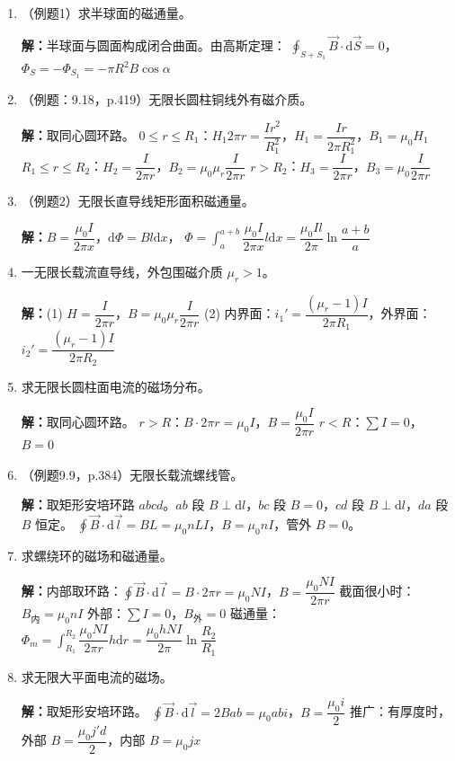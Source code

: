 \documentclass{ctexart}
\begin{document}
\begin{enumerate}
\item（例题1）求半球面的磁通量。

\textbf{解：}半球面与圆面构成闭合曲面。由高斯定理：
$\displaystyle\oint_{S+S_1} \vec{B}\cdot\mathrm{d}\vec{S} = 0$，$\Phi_S = -\Phi_{S_1} = -\pi R^{2}B\cos\alpha$

\item（例题：9.18，p.419）无限长圆柱铜线外有磁介质。

\textbf{解：}取同心圆环路。
$0 \le r \le R_1$：$H_1 2\pi r = \dfrac{Ir^{2}}{R_1^{2}}$，$H_1 = \dfrac{Ir}{2\pi R_1^{2}}$，$B_1 = \mu_0 H_1$
$R_1 \le r \le R_2$：$H_2 = \dfrac{I}{2\pi r}$，$B_2 = \mu_0\mu_r\dfrac{I}{2\pi r}$
$r > R_2$：$H_3 = \dfrac{I}{2\pi r}$，$B_3 = \mu_0\dfrac{I}{2\pi r}$

\item（例题2）无限长直导线矩形面积磁通量。

\textbf{解：}$B = \dfrac{\mu_0 I}{2\pi x}$，$\mathrm{d}\Phi = B l\mathrm{d}x$，
$\Phi = \displaystyle\int_a^{a+b} \dfrac{\mu_0 I}{2\pi x}l\mathrm{d}x = \dfrac{\mu_0 Il}{2\pi}\ln\dfrac{a+b}{a}$

\item 一无限长载流直导线，外包围磁介质 $\mu_r > 1$。

\textbf{解：}(1) $H = \dfrac{I}{2\pi r}$，$B = \mu_0\mu_r\dfrac{I}{2\pi r}$
(2) 内界面：$i_1' = \dfrac{(\mu_r - 1)I}{2\pi R_1}$，外界面：$i_2' = \dfrac{(\mu_r - 1)I}{2\pi R_2}$

\item 求无限长圆柱面电流的磁场分布。

\textbf{解：}取同心圆环路。
$r > R$：$B\cdot 2\pi r = \mu_0 I$，$B = \dfrac{\mu_0 I}{2\pi r}$
$r < R$：$\sum I = 0$，$B = 0$

\item（例题9.9，p.384）无限长载流螺线管。

\textbf{解：}取矩形安培环路 $abcd$。$ab$ 段 $B\perp\mathrm{d}l$，$bc$ 段 $B = 0$，$cd$ 段 $B\perp\mathrm{d}l$，$da$ 段 $B$ 恒定。
$\displaystyle\oint \vec{B}\cdot\mathrm{d}\vec{l} = BL = \mu_0 nLI$，$B = \mu_0 nI$，管外 $B = 0$。

\item 求螺绕环的磁场和磁通量。

\textbf{解：}内部取环路：$\displaystyle\oint \vec{B}\cdot\mathrm{d}\vec{l} = B\cdot 2\pi r = \mu_0 NI$，$B = \dfrac{\mu_0 NI}{2\pi r}$
截面很小时：$B_{\text{内}} = \mu_0 nI$
外部：$\sum I = 0$，$B_{\text{外}} = 0$
磁通量：$\Phi_m = \displaystyle\int_{R_1}^{R_2} \dfrac{\mu_0 NI}{2\pi r}h\mathrm{d}r = \dfrac{\mu_0 hNI}{2\pi}\ln\dfrac{R_2}{R_1}$

\item 求无限大平面电流的磁场。

\textbf{解：}取矩形安培环路。
$\displaystyle\oint \vec{B}\cdot\mathrm{d}\vec{l} = 2Bab = \mu_0 ab i$，$B = \dfrac{\mu_0 i}{2}$
推广：有厚度时，外部 $B = \dfrac{\mu_0 j'd}{2}$，内部 $B = \mu_0 j x$

\end{enumerate}
\end{document}
